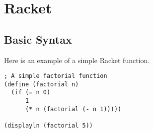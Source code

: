 
\section{Racket}

\lipsum[1] %

\subsection{Basic Syntax}
Here is an example of a simple Racket function.
\begin{lstlisting}[style=racketstyle]
; A simple factorial function
(define (factorial n)
  (if (= n 0)
      1
      (* n (factorial (- n 1)))))

(displayln (factorial 5))
\end{lstlisting}

\lipsum[2]


